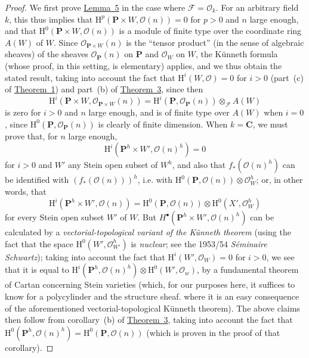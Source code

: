 \documentclass{article}
\newcommand{\scr}[1]{{\mathscr{#1}}}
\newcommand{\HH}{\mathrm{H}}
\newcommand{\oldpage}[1]{\marginpar{\footnotesize$\Big\vert$ \textit{p.~#1}}}
\begin{document}
\begin{proof}
  We first prove \hyperref[lemma5]{Lemma~5} in the case where $\scr{F}=\scr{O}_k$.
  For an arbitrary field $k$, this thus implies that $\HH^p(\mathbf{P}\times W,\scr{O}(n))=0$ for $p>0$ and $n$ large enough, and that $\HH^0(\mathbf{P}\times W,\scr{O}(n))$ is a module of finite type over the coordinate ring $A(W)$ of $W$.
  Since $\scr{O}_{\mathbf{P}\times W}(n)$ is the ``tensor product'' (in the sense of algebraic sheaves) of the sheaves $\scr{O}_\mathbf{P}(n)$ on $\mathbf{P}$ and $\scr{O}_W$ on $W$, the K\"{u}nneth formula (whose proof, in this setting, is elementary) applies, and we thus obtain the stated result, taking into account the fact that $\HH^i(W,\scr{O})=0$ for $i>0$ (part~(c) of \hyperref[theorem1]{Theorem~1}) and part~(b) of \hyperref[theorem3]{Theorem~3}, since then
  \[
    \HH^i(\mathbf{P}\times W,\scr{O}_{\mathbf{P}\times W}(n))
    = \HH^i(\mathbf{P},\scr{O}_\mathbf{P}(n))\otimes_\scr{F} A(W)
  \]
  is zero for $i>0$ and $n$ large enough, and is of finite type over $A(W)$ when $i=0$, since $\HH^0(\mathbf{P},\scr{O}_\mathbf{P}(n))$ is clearly of finite dimension.
  When $k=\mathbf{C}$, we must prove that, for $n$ large enough, \[\HH^i(\mathbf{P}^h\times W',\scr{O}(n)^h)=0\] for $i>0$ and $W'$ any Stein open subset of $W^h$, and also that $f_*(\scr{O}(n)^h)$ can be identified with $(f_*(\scr{O}(n)))^h$, i.e. with $\HH^0(\mathbf{P},\scr{O}(n))\otimes\scr{O}_W^h$;
  or, in other words, that
  \[
    \HH^i(\mathbf{P}^h\times W',\scr{O}(n))
    = \HH^0(\mathbf{P},\scr{O}(n))\otimes\HH^0(X',\scr{O}_W^h)
  \]
  for every Stein open subset $W'$ of $W$.
  But $H^\bullet(\mathbf{P}^h\times W',\scr{O}(n)^h)$ can be calculated by a \emph{vectorial-topological variant of the K\"{u}nneth theorem} (using the fact that the space
\oldpage{2-13}
  $\HH^0(W',\scr{O}_{W'}^h)$ is \emph{nuclear};
  see the 1953/54 \emph{S\'{e}minaire Schwartz});
  taking into account the fact that $\HH^i(W',\scr{O}_W)=0$ for $i>0$, we see that it is equal to $\HH^i(\mathbf{P}^h,\scr{O}(n)^h)\otimes\HH^0(W',\scr{O}_w)$, by a fundamental theorem of Cartan concerning Stein varieties (which, for our purposes here, it suffices to know for a polycylinder and the structure sheaf. where it is an easy consequence of the aforementioned vectorial-topological K\"{u}nneth theorem).
  The above claims then follow from corollary~(b) of \hyperref[theorem3]{Theorem~3}, taking into account the fact that $\HH^0(\mathbf{P}^h,\scr{O}(n)^h)=\HH^0(\mathbf{P},\scr{O}(n))$ (which is proven in the proof of that corollary).


\end{proof}
\end{document}
